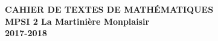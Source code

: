\documentclass[12pt,a4paper]{article}
\begin{document}
\begin{center}
\Large\bf CAHIER DE TEXTES DE MATHÉMATIQUES\\
MPSI 2 La Martinière Monplaisir\\ 2017-2018
\end{center}
\vspace{1cm}
\vspace{.4cm}

% 
% 
% 
% 
% 
% 
% 
% 
% 

% 
%
\end{document}
